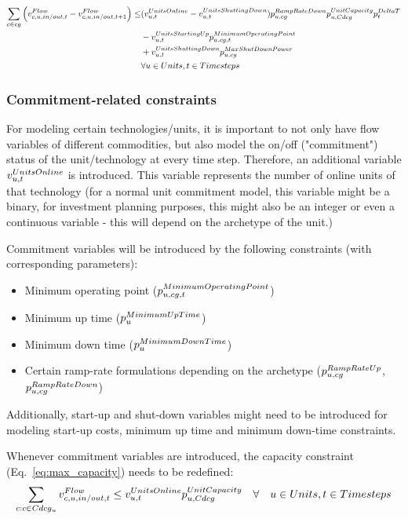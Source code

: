 \begin{align} \label{eq:downdwardrampingconstraintwithcommitmentvariables}
\sum_{\commodity \in cg} \Big( \vFlow - \vFlow[\commodity,\unit,in/out,\timestep+1] \Big) \le &(\vUnitsOnline-\vUnitsShuttingDown) \pRampRateDown \pUnitCapacity \pDeltaT \nonumber \\
& - \vUnitsStartingUp \pMinimumOperatingPoint \nonumber \\
& + \vUnitsShuttingDown \pMaxShutDownPower \nonumber \\
& \forall \units, \timesteps
\end{align}






\subsubsection{Commitment-related constraints}
For modeling certain technologies/units, it is important to not only have flow variables of different commodities, but also model the on/off ("commitment") status of the unit/technology at every time step. Therefore, an additional variable $\vUnitsOnline$ is introduced. This variable represents the number of online units of that technology (for a normal unit commitment model, this variable might be a binary, for investment planning purposes, this might also be an integer or even a continuous variable - this will depend on the archetype of the unit.)

Commitment variables will be introduced by the following constraints (with corresponding parameters):
\begin{itemize}
	\item Minimum operating point ($\pMinimumOperatingPoint$)
	\item Minimum up time ($\pMinimumUpTime$)
	\item Minimum down time ($\pMinimumDownTime$)
	\item Certain ramp-rate formulations depending on the archetype ($\pRampRateUp$, $\pRampRateDown$)
\end{itemize}

Additionally, start-up and shut-down variables might need to be introduced for modeling start-up costs, minimum up time and minimum down-time constraints.

Whenever commitment variables are introduced, the capacity constraint (Eq.~\eqref{eq:max_capacity}) needs to be redefined:
\begin{equation} \label{eq:maximumoperatingpoint}
\sum_{\commodity : \commodity \in Cdcg_{\unit}} \vFlow \le \vUnitsOnline \pUnitCapacity \quad \forall \quad \units, \timesteps
\end{equation}

